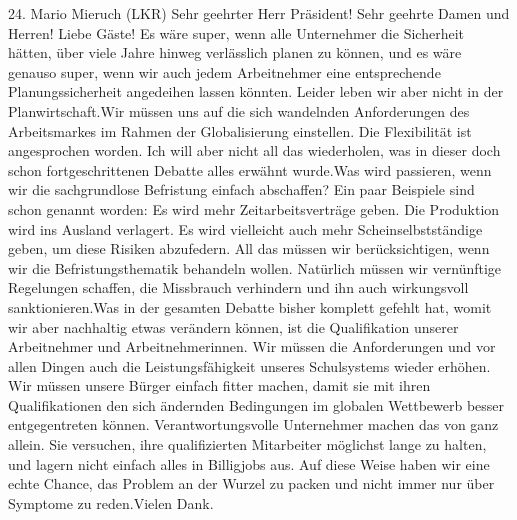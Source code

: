 \documentclass{article}
\begin{document}
	24. Mario Mieruch (LKR) Sehr geehrter Herr Präsident! Sehr geehrte Damen und Herren! Liebe Gäste! Es wäre super, wenn alle Unternehmer die Sicherheit hätten, über viele Jahre hinweg verlässlich planen zu können, und es wäre genauso super, wenn wir auch jedem Arbeitnehmer eine entsprechende Planungssicherheit angedeihen lassen könnten. Leider leben wir aber nicht in der Planwirtschaft.Wir müssen uns auf die sich wandelnden Anforderungen des Arbeitsmarkes im Rahmen der Globalisierung einstellen. Die Flexibilität ist angesprochen worden. Ich will aber nicht all das wiederholen, was in dieser doch schon fortgeschrittenen Debatte alles erwähnt wurde.Was wird passieren, wenn wir die sachgrundlose Befristung einfach abschaffen? Ein paar Beispiele sind schon genannt worden: Es wird mehr Zeitarbeitsverträge geben. Die Produktion wird ins Ausland verlagert. Es wird vielleicht auch mehr Scheinselbstständige geben, um diese Risiken abzufedern. All das müssen wir berücksichtigen, wenn wir die Befristungsthematik behandeln wollen. Natürlich müssen wir vernünftige Regelungen schaffen, die Missbrauch verhindern und ihn auch wirkungsvoll sanktionieren.Was in der gesamten Debatte bisher komplett gefehlt hat, womit wir aber nachhaltig etwas verändern können, ist die Qualifikation unserer Arbeitnehmer und Arbeitnehmerinnen. Wir müssen die Anforderungen und vor allen Dingen auch die Leistungsfähigkeit unseres Schulsystems wieder erhöhen. Wir müssen unsere Bürger einfach fitter machen, damit sie mit ihren Qualifikationen den sich ändernden Bedingungen im globalen Wettbewerb besser entgegentreten können. Verantwortungsvolle Unternehmer machen das von ganz allein. Sie versuchen, ihre qualifizierten Mitarbeiter möglichst lange zu halten, und lagern nicht einfach alles in Billigjobs aus. Auf diese Weise haben wir eine echte Chance, das Problem an der Wurzel zu packen und nicht immer nur über Symptome zu reden.Vielen Dank.
\end{document}
